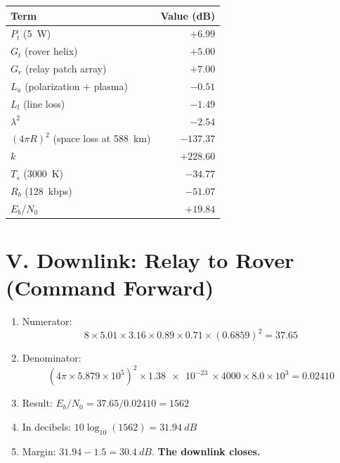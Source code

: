 \documentclass[11pt]{article}
\begin{document}
\begin{center}
\begin{tabular}{lr}
\toprule
Term & Value (dB) \\
\midrule
$P_t$ (\SI{5}{W})                        & $+6.99$ \\
$G_t$ (rover helix)                      & $+5.00$ \\
$G_r$ (relay patch array)                & $+7.00$ \\
$L_a$ (polarization + plasma)            & $-0.51$ \\
$L_l$ (line loss)                        & $-1.49$ \\
$\lambda^2$                              & $-2.54$ \\
$(4\pi R)^2$ (space loss at \SI{588}{km})& $-137.37$ \\
$k$                                      & $+228.60$ \\
$T_s$ (\SI{3000}{K})                     & $-34.77$ \\
$R_b$ (\SI{128}{kbps})                   & $-51.07$ \\
\midrule
$E_b/N_0$                                & $\mathbf{+19.84}$ \\
\bottomrule
\end{tabular}
\end{center}

\section*{V. Downlink: Relay to Rover (Command Forward)}

\begin{enumerate}[label=\alph*., leftmargin=*]
    \item Numerator:
    \[
        8 \times 5.01 \times 3.16 \times 0.89 \times 0.71 \times (0.6859)^2 = 37.65
    \]
    \item Denominator:
    \[
        \left(4\pi \times 5.879\!\times\!10^5\right)^2 \times \SI{1.38e-23}{} \times 4000
          \times 8.0\!\times\!10^3 = 0.02410
    \]
    \item Result: $E_b/N_0 = 37.65 / 0.02410 = 1562$
    \item In decibels: $10\log_{10}(1562) = \SI{31.94}{dB}$
    \item Margin: $31.94 - 1.5 = \SI{30.4}{dB}$. \textbf{The downlink closes.}
\end{enumerate}
\end{document}
